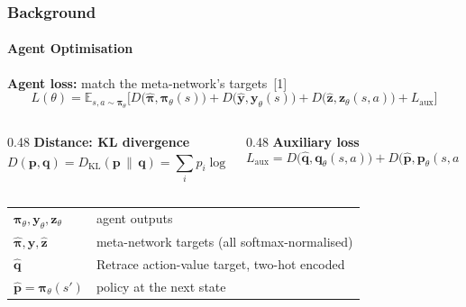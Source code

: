 
\begin{frame}
	\frametitle{Background}
	\framesubtitle{Agent Optimisation}

	\textbf{Agent loss:} match the meta-network's targets~[1]
	\[
		L(\theta) = \mathbb{E}_{s,a\sim\boldsymbol{\pi}_\theta}\Big[
			D\big(\hat{\boldsymbol{\pi}}, \boldsymbol{\pi}_\theta(s)\big)
			+ D\big(\hat{\mathbf{y}}, \mathbf{y}_\theta(s)\big)
			+ D\big(\hat{\mathbf{z}}, \mathbf{z}_\theta(s,a)\big)
			+ L_{\text{aux}}
		\Big]
	\]

	\begin{columns}[T]
		\begin{column}{0.48\linewidth}
			\textbf{Distance: KL divergence}
			\[
				D(\mathbf{p},\mathbf{q}) = D_{\text{KL}}(\mathbf{p}\,\|\,\mathbf{q})
				= \sum_i p_i \log \frac{p_i}{q_i}
			\]
		\end{column}
		\begin{column}{0.48\linewidth}
			\textbf{Auxiliary loss}
			\[
				L_{\text{aux}} = D\big(\hat{\mathbf{q}}, \mathbf{q}_\theta(s,a)\big)
				+ D\big(\hat{\mathbf{p}}, \mathbf{p}_\theta(s,a)\big)
			\]
		\end{column}
	\end{columns}

	\vfill
	\footnotesize
	\begin{tabular}{@{}l@{\quad}l@{}}
		$\boldsymbol{\pi}_\theta, \mathbf{y}_\theta, \mathbf{z}_\theta$ & agent outputs \\
		$\hat{\boldsymbol{\pi}}, \hat{\mathbf{y}}, \hat{\mathbf{z}}$ & meta-network targets (all softmax-normalised) \\
		$\hat{\mathbf{q}}$ & Retrace action-value target, two-hot encoded \\
		$\hat{\mathbf{p}} = \boldsymbol{\pi}_\theta(s')$ & policy at the next state \\
	\end{tabular}
\end{frame}
